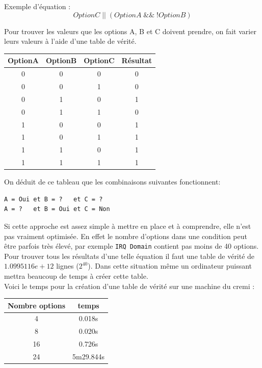 \documentclass[16pts]{report}
\begin{document}
Exemple d'équation :
\begin{equation}
OptionC\;||\;(OptionA\;\&\&\;!OptionB)
\end{equation}

Pour trouver les valeurs que les options A, B et C doivent prendre, on fait
varier leurs valeurs à l'aide d'une table de vérité.  \\
\newline
\begin{tabular}{|c|c|c||c|}
    \hline
    OptionA & OptionB & OptionC & Résultat\\
    \hline
    \hline
    0 & 0 & 0 & 0\\
    \hline
    0 & 0 & 1 & 0\\
    \hline
    0 & 1 & 0 & 1\\
    \hline
    0 & 1 & 1 & 0\\
    \hline
    1 & 0 & 0 & 1\\
    \hline
    1 & 0 & 1 & 1\\
    \hline
    1 & 1 & 0 & 1\\
    \hline
    1 & 1 & 1 & 1\\
    \hline
\end{tabular}
\newline
\newline

On déduit de ce tableau que les combinaisons suivantes fonctionnent:
\begin{verbatim}
A = Oui et B = ?   et C = ?
A = ?   et B = Oui et C = Non
\end{verbatim}

Si cette approche est assez simple à mettre en place et à comprendre, elle
n'est pas vraiment optimisée. En effet le nombre d'options dans une condition
peut être parfois très élevé, par exemple \verb|IRQ Domain| contient pas
moins de 40 options.\\
Pour trouver tous les résultats d'une telle équation il faut une table
de vérité de $1.0995116e+12$ lignes ($2^{40}$). Dans cette situation même
un ordinateur puissant mettra beaucoup de temps à créer cette table.
\\
Voici le temps pour la création d'une table de vérité sur une machine du cremi :
\\

\begin{tabular}{|c|c|}
    \hline
    Nombre options & temps\\
    \hline
    \hline
    4 & 0.018s\\
    \hline
    8 & 0.020s\\
    \hline
    16 & 0.726s\\
    \hline
    24 & 5m29.844s\\
    \hline
\end{tabular}
\newline
\newline
\end{document}
